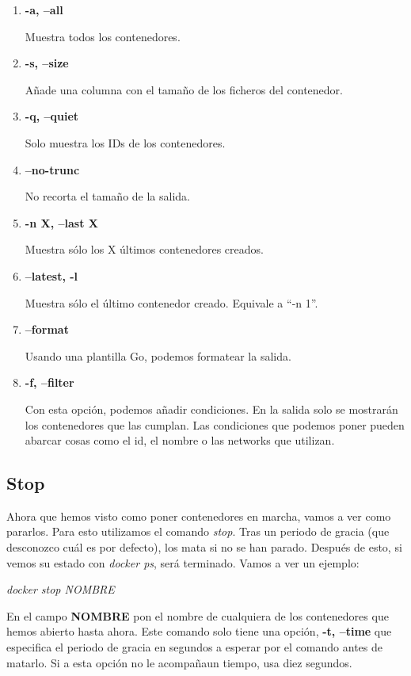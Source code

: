 \documentclass[]{article}
\begin{document}
\begin{enumerate}
	\renewcommand{\labelenumi}{$ \bullet $}
	\item {\bf -a, --all}
	
		Muestra todos los contenedores.
	\item {\bf -s, --size}
		
		Añade una columna con el tamaño de los ficheros del contenedor.
		
	\item {\bf -q, --quiet}
	
		Solo muestra los IDs de los contenedores.
		
	\item {\bf --no-trunc}
	
		No recorta el tamaño de la salida.
	\item {\bf -n X, --last X}
	
		Muestra sólo los X últimos contenedores creados.
	\item {\bf --latest, -l}
	
		Muestra sólo el último contenedor creado. Equivale a ``-n 1''.
	\item {\bf --format}
	
		Usando una plantilla Go, podemos formatear la salida.
	\item {\bf -f, --filter}
	
		Con esta opción, podemos añadir condiciones. En la salida solo se mostrarán los contenedores que las cumplan.
		Las condiciones que podemos poner pueden abarcar cosas como el id, el nombre o las networks que utilizan.

\end{enumerate}

\subsection{Stop}
Ahora que hemos visto como poner contenedores en marcha, vamos a ver como pararlos.
Para esto utilizamos el comando {\it stop}. Tras un periodo de gracia (que desconozco cuál es por defecto), los mata si no se han parado. Después de esto, si vemos su estado con {\it docker ps}, será terminado. Vamos a ver un ejemplo:

\begin{center}
\it
docker stop NOMBRE

\end{center}
En el campo {\bf NOMBRE} pon el nombre de cualquiera de los contenedores que hemos abierto hasta ahora.
Este comando solo tiene una opción, {\bf -t, --time} que especifica el periodo de gracia en segundos a esperar por el comando antes de matarlo. Si a esta opción no le acompañaun tiempo, usa diez segundos.
\end{document}
